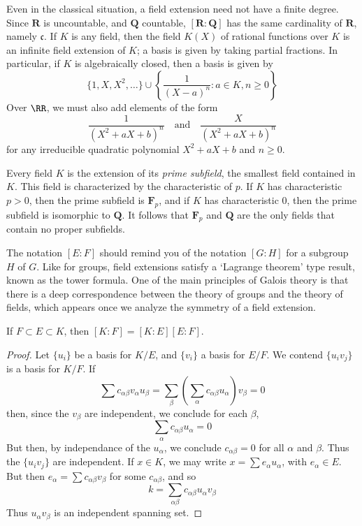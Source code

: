 \begin{example}
	Even in the classical situation, a field extension need not have a finite degree. Since $\mathbf{R}$ is uncountable, and $\mathbf{Q}$ countable, $[\mathbf{R}: \mathbf{Q}]$ has the same cardinality of $\mathbf{R}$, namely $\mathfrak{c}$. If $K$ is any field, then the field $K(X)$ of rational functions over $K$ is an infinite field extension of $K$; a basis is given by taking partial fractions. In particular, if $K$ is algebraically closed, then a basis is given by
	\[ \{ 1, X, X^2, \dots \} \cup \left\{ \frac{1}{(X - a)^n}: a \in K, n \geq 0 \right\} \]
	Over $\RR$, we must also add elements of the form
	\[ \frac{1}{(X^2 + aX + b)^n} \quad\text{and}\quad \frac{X}{(X^2 + aX + b)^n} \]
	for any irreducible quadratic polynomial $X^2 + aX + b$ and $n \geq 0$.
\end{example}

\begin{example}
    Every field $K$ is the extension of its {\it prime subfield}, the smallest field contained in $K$. This field is characterized by the characteristic of $p$. If $K$ has characteristic $p > 0$, then the prime subfield is $\mathbf{F}_p$, and if $K$ has characteristic 0, then the prime subfield is isomorphic to $\mathbf{Q}$. It follows that $\mathbf{F}_p$ and $\mathbf{Q}$ are the only fields that contain no proper subfields.
\end{example}

The notation $[E:F]$ should remind you of the notation $[G:H]$ for a subgroup $H$ of $G$. Like for groups, field extensions satisfy a `Lagrange theorem' type result, known as the tower formula. One of the main principles of Galois theory is that there is a deep correspondence between the theory of groups and the theory of fields, which appears once we analyze the symmetry of a field extension.

\begin{theorem}
    If $F \subset E \subset K$, then $[K:F] = [K:E][E:F]$.
\end{theorem}
\begin{proof}
    Let $\{ u_i \}$ be a basis for $K/E$, and $\{ v_i \}$ a basis for $E/F$. We contend $\{ u_i v_j \}$ is a basis for $K/F$. If
    \[ \sum c_{\alpha \beta} v_\alpha u_\beta = \sum_\beta \left( \sum_\alpha c_{\alpha \beta} u_\alpha \right) v_\beta = 0 \]
    then, since the $v_\beta$ are independent, we conclude for each $\beta$,
    \[ \sum_\alpha c_{\alpha \beta} u_\alpha = 0 \]
    But then, by independance of the $u_\alpha$, we conclude $c_{\alpha \beta} = 0$ for all $\alpha$ and $\beta$. Thus the $\{ u_i v_j \}$ are independent. If $x \in K$, we may write $x = \sum e_\alpha u_\alpha$, with $e_\alpha \in E$. But then $e_\alpha = \sum c_{\alpha \beta} v_\beta$ for some $c_{\alpha \beta}$, and so
    \[ k = \sum_{\alpha \beta} c_{\alpha \beta} u_\alpha v_\beta \]
    Thus $u_\alpha v_\beta$ is an independent spanning set.
\end{proof}

